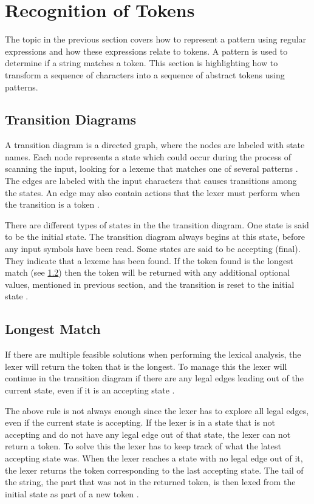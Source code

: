 \section{Recognition of Tokens}
The topic in the previous section covers how to represent a pattern using
regular expressions and how these expressions relate to tokens. A pattern is
used to determine if a string matches a token. This section is highlighting how
to transform a sequence of characters into a sequence of abstract tokens using
patterns.

\subsection{Transition Diagrams}
A transition diagram is a directed graph, where the
nodes are labeled with state names. Each node represents a state which could
occur during the process of scanning the input, looking for a lexeme that
matches one of several patterns \cite{Aho2006}. The edges are labeled with the
input characters that causes transitions among the states. An edge may also
contain actions that the lexer must perform when the transition is a token
\cite{sebesta2012}.

There are different types of states in the the transition diagram. One
state is said to be the initial state. The transition diagram always begins at
this state, before any input symbols have been read. Some states are said to be
accepting (final). They indicate that a lexeme has been found. If the token
found is the longest match (see \cref{sub:longmatch}) then the token will be
returned with any additional optional values, mentioned in previous section, and
the transition is reset to the initial state \cite{Aho2006}.

\subsection{Longest Match}\label{sub:longmatch}
If there are multiple feasible solutions when performing the lexical
analysis, the lexer will return the token that is the longest. To manage this
the lexer will continue in the transition diagram if there are any legal edges
leading out of the current state, even if it is an accepting state \cite{Aho2006}.

The above rule is not always enough since the lexer has to explore all legal
edges, even if the current state is accepting. If the lexer is in a state that
is not accepting and do not have any legal edge out of that state, the lexer
can not return a token. To solve this the lexer has to keep track of what the
latest accepting state was. When the lexer reaches a state with no
legal edge out of it, the lexer returns the token corresponding to the last
accepting state. The tail of the string, the part that was not in the returned
token, is then lexed from the initial state as part of a new token
\cite{Aho2006}.

